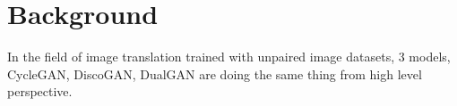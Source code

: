 \chapter{Background}\label{Ch:Background}
In the field of image translation trained with unpaired image datasets, 3 models, CycleGAN, DiscoGAN, DualGAN are doing the same thing from high level perspective.










